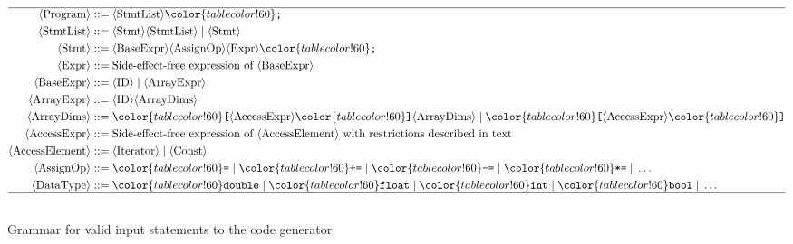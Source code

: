 \begin{figure}[t!]    
\footnotesize
  \begin{align}
    \hline
    \langle\text{Program}\rangle ::=& \;  \langle\text{StmtList}\rangle {\color{tablecolor!60}\texttt{;}} \nonumber \\
    \langle\text{StmtList}\rangle ::=& \; \langle\text{Stmt}\rangle \langle\text{StmtList}\rangle \; | \; \langle\text{Stmt}\rangle \nonumber \\
    \langle\text{Stmt}\rangle ::=& \; \langle\text{BaseExpr}\rangle \langle\text{AssignOp}\rangle \langle\text{Expr}\rangle {\color{tablecolor!60}\texttt{;}} \nonumber \\
    \langle\text{Expr}\rangle ::=& \; \text{Side-effect-free expression of~} \langle\text{BaseExpr}\rangle \nonumber \\
    \langle\text{BaseExpr}\rangle ::=& \; \langle\text{ID}\rangle \; | \; \langle\text{ArrayExpr}\rangle \nonumber \\
    \langle\text{ArrayExpr}\rangle ::=& \; \langle\text{ID}\rangle \langle\text{ArrayDims}\rangle \nonumber \\
    \langle\text{ArrayDims}\rangle ::=& \; {\color{tablecolor!60}\texttt{[}}\langle\text{AccessExpr}\rangle {\color{tablecolor!60}\texttt{]}} \langle\text{ArrayDims}\rangle \; | \; {\color{tablecolor!60}\texttt{[}}\langle\text{AccessExpr}\rangle {\color{tablecolor!60}\texttt{]}} \nonumber \\
    \langle\text{AccessExpr}\rangle ::=& \; \text{Side-effect-free expression of~} \langle\text{AccessElement}\rangle \text{ with restrictions described in text}\nonumber \\
	\langle\text{AccessElement}\rangle ::=& \; \langle\text{Iterator}\rangle \; | \; \langle\text{Const}\rangle \nonumber \\
    \langle\text{AssignOp}\rangle ::=& \; {\color{tablecolor!60}\texttt{=}} \; | \; {\color{tablecolor!60}\texttt{+=}} \; | \; {\color{tablecolor!60}\texttt{-=}} \; | \; {\color{tablecolor!60}\texttt{*=}} \; | \; \ldots \nonumber  \\
    \langle\text{DataType}\rangle ::=& \; {\color{tablecolor!60}\texttt{double}} \; | \; {\color{tablecolor!60}\texttt{float}} \; | \; {\color{tablecolor!60}\texttt{int}} \; | \; {\color{tablecolor!60}\texttt{bool}} \; | \; \ldots \nonumber  \\
    \hline \nonumber
  \end{align}
\vspace*{-0.6cm}
  \caption{Grammar for valid input statements to the code generator}
\label{fig:start-grammar}
\end{figure}


